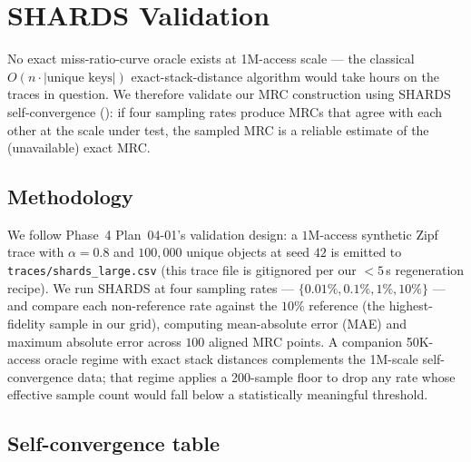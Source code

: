 \section{SHARDS Validation}\label{sec:shards}

No exact miss-ratio-curve oracle exists at 1M-access scale --- the classical
$O(n \cdot |\text{unique keys}|)$ exact-stack-distance algorithm would take
hours on the traces in question. We therefore validate our MRC construction
using SHARDS self-convergence (\cite{waldspurger2015shards}): if four
sampling rates produce MRCs that agree with each other at the scale under
test, the sampled MRC is a reliable estimate of the (unavailable) exact MRC.

\subsection*{Methodology}

We follow Phase~4 Plan~04-01's validation design: a $1$M-access synthetic
Zipf trace with $\alpha = 0.8$ and $100{,}000$ unique objects at seed $42$ is
emitted to \texttt{traces/shards\_large.csv} (this trace file is gitignored
per our ${<}5\,$s regeneration recipe). We run SHARDS at four sampling
rates --- $\{0.01\%, 0.1\%, 1\%, 10\%\}$ --- and compare each non-reference
rate against the $10\%$ reference (the highest-fidelity sample in our grid),
computing mean-absolute error (MAE) and maximum absolute error across $100$
aligned MRC points. A companion 50K-access oracle regime with exact stack
distances complements the 1M-scale self-convergence data; that regime applies
a 200-sample floor to drop any rate whose effective sample count would
fall below a statistically meaningful threshold.

\subsection*{Self-convergence table}

